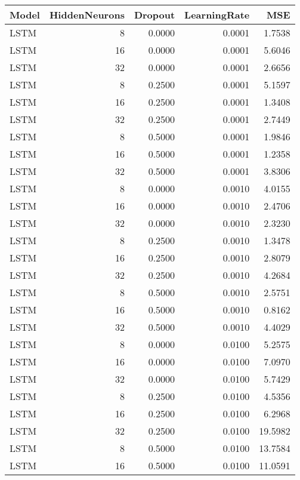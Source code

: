 \begin{table}[h!]
\centering
 \begin{adjustbox}{max width=\textwidth}
\begin{tabular}{lrrrr}
  \hline
Model & HiddenNeurons & Dropout & LearningRate & MSE \\ 
  \hline
LSTM &     8 & 0.0000 & 0.0001 & 1.7538 \\ 
  LSTM &    16 & 0.0000 & 0.0001 & 5.6046 \\ 
  LSTM &    32 & 0.0000 & 0.0001 & 2.6656 \\ 
  LSTM &     8 & 0.2500 & 0.0001 & 5.1597 \\ 
  LSTM &    16 & 0.2500 & 0.0001 & 1.3408 \\ 
  LSTM &    32 & 0.2500 & 0.0001 & 2.7449 \\ 
  LSTM &     8 & 0.5000 & 0.0001 & 1.9846 \\ 
  LSTM &    16 & 0.5000 & 0.0001 & 1.2358 \\ 
  LSTM &    32 & 0.5000 & 0.0001 & 3.8306 \\ 
  LSTM &     8 & 0.0000 & 0.0010 & 4.0155 \\ 
  LSTM &    16 & 0.0000 & 0.0010 & 2.4706 \\ 
  LSTM &    32 & 0.0000 & 0.0010 & 2.3230 \\ 
  LSTM &     8 & 0.2500 & 0.0010 & 1.3478 \\ 
  LSTM &    16 & 0.2500 & 0.0010 & 2.8079 \\ 
  LSTM &    32 & 0.2500 & 0.0010 & 4.2684 \\ 
  LSTM &     8 & 0.5000 & 0.0010 & 2.5751 \\ 
  LSTM &    16 & 0.5000 & 0.0010 & 0.8162 \\ 
  LSTM &    32 & 0.5000 & 0.0010 & 4.4029 \\ 
  LSTM &     8 & 0.0000 & 0.0100 & 5.2575 \\ 
  LSTM &    16 & 0.0000 & 0.0100 & 7.0970 \\ 
  LSTM &    32 & 0.0000 & 0.0100 & 5.7429 \\ 
  LSTM &     8 & 0.2500 & 0.0100 & 4.5356 \\ 
  LSTM &    16 & 0.2500 & 0.0100 & 6.2968 \\ 
  LSTM &    32 & 0.2500 & 0.0100 & 19.5982 \\ 
  LSTM &     8 & 0.5000 & 0.0100 & 13.7584 \\ 
  LSTM &    16 & 0.5000 & 0.0100 & 11.0591 \\ 

\end{tabular}
\end{adjustbox}
\end{table}
